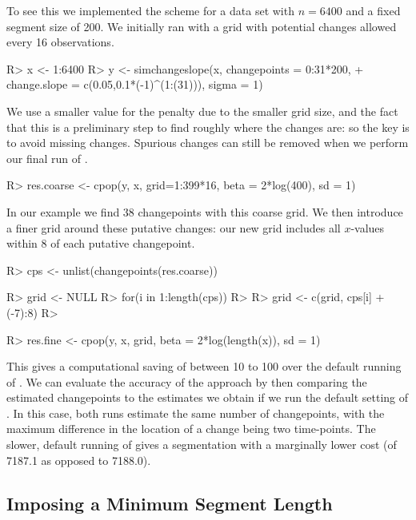 \documentclass[nojss]{jss}
\begin{document}
To see this we implemented the scheme for a data set with $n=6400$ and a fixed segment size of 200.  We initially ran  with a grid with potential changes allowed every 16 observations.
\begin{CodeChunk}
\begin{CodeInput}
R> x <- 1:6400
R> y <- simchangeslope(x, changepoints = 0:31*200, 
+ change.slope = c(0.05,0.1*(-1)^(1:(31))), sigma = 1)
\end{CodeInput}
\end{CodeChunk}

We use a smaller value for the penalty due to the smaller grid size, and the fact that this is a preliminary step to find roughly where the changes are: so the key is to avoid missing changes. Spurious changes can still be removed when we perform our final run of . 
\begin{CodeChunk}
\begin{CodeInput}
R> res.coarse <- cpop(y, x, grid=1:399*16, beta = 2*log(400), sd = 1)
\end{CodeInput}
\end{CodeChunk}

In our example we find 38 changepoints with this coarse grid. We then introduce a finer grid around these putative changes: our new grid includes all $x$-values within 8 of each putative changepoint.
\begin{CodeChunk}
\begin{CodeInput}
R> cps <- unlist(changepoints(res.coarse))

R> grid <- NULL
R> for(i in 1:length(cps))
R> {
R>   grid <- c(grid, cps[i] + (-7):8)
R> }

R> res.fine <- cpop(y, x, grid, beta = 2*log(length(x)), sd = 1)
\end{CodeInput}
\end{CodeChunk}

This gives a computational saving of between 10 to 100 over the default running of . We can evaluate the accuracy of the approach by then comparing the estimated changepoints to the estimates we obtain if we run the default setting of . In this case, both runs estimate the same number of changepoints, with the maximum difference in the location of a change being two time-points. The slower, default running of  gives a segmentation with a marginally lower cost (of 7187.1 as opposed to 7188.0).

\subsection{Imposing a Minimum Segment Length}
\end{document}
